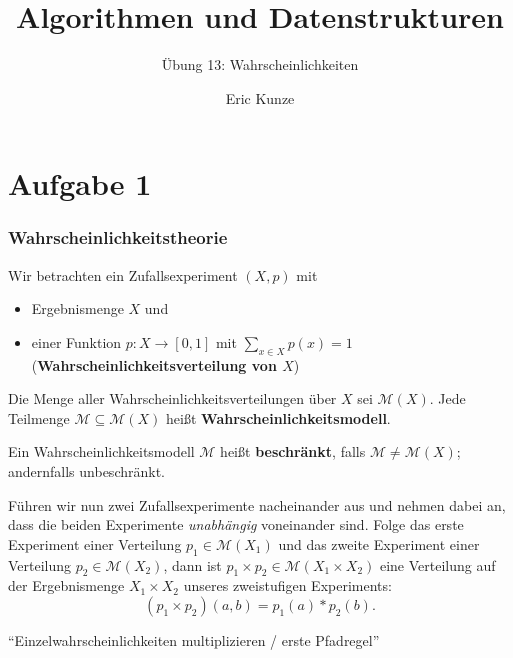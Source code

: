 \documentclass{beamer}
\begin{document}
	
	\title{Algorithmen und Datenstrukturen}
	\subtitle{Übung 13: Wahrscheinlichkeiten}
	\author{Eric Kunze}
	\date{}

	\maketitle


\section{Aufgabe 1}

\begin{frame} \frametitle{Wahrscheinlichkeitstheorie}
	\justifying \footnotesize
	Wir betrachten ein Zufallsexperiment $(X,p)$ mit
	\begin{itemize}
		\item Ergebnismenge $X$ und
		\item einer Funktion $p \colon X \to [0,1]$ mit $\sum_{x \in X} p(x) = 1$ (\textbf{Wahrscheinlichkeitsverteilung von $X$})
	\end{itemize}
	\pause
	
	Die Menge aller Wahrscheinlichkeitsverteilungen über $X$ sei $\mathcal{M}(X)$. Jede Teilmenge $\mathcal{M} \subseteq \mathcal{M}(X)$ heißt \textbf{Wahrscheinlichkeitsmodell}.
	\pause
	
	Ein Wahrscheinlichkeitsmodell $\mathcal{M}$ heißt \textbf{beschränkt}, falls $\mathcal{M} \neq \mathcal{M}(X)$; andernfalls unbeschränkt.
	\pause
	
	Führen wir nun zwei Zufallsexperimente nacheinander aus und nehmen dabei an, dass die beiden Experimente \textit{unabhängig} voneinander sind. Folge das erste Experiment einer Verteilung $p_1 \in \mathcal{M}(X_1)$ und das zweite Experiment einer Verteilung $p_2 \in \mathcal{M}(X_2)$, dann ist $p_1 \times p_2 \in \mathcal{M}(X_1 \times X_2)$ eine Verteilung auf der Ergebnismenge $X_1 \times X_2$ unseres zweistufigen Experiments:
	\vspace{-.5\baselineskip}
	\begin{equation*}
		(p_1 \times p_2)(a,b) = p_1(a) * p_2(b) .
	\end{equation*}
	\vspace{-1.5\baselineskip}
	\begin{center}
		\enquote{Einzelwahrscheinlichkeiten multiplizieren / erste Pfadregel}
	\end{center}
\end{frame}
\end{document}
